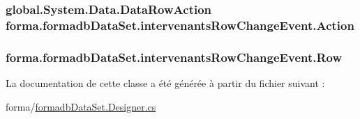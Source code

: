 \subsubsection[{\texorpdfstring{Action}{Action}}]{\setlength{\rightskip}{0pt plus 5cm}global.\+System.\+Data.\+Data\+Row\+Action forma.\+formadb\+Data\+Set.\+intervenants\+Row\+Change\+Event.\+Action\hspace{0.3cm}{\ttfamily [get]}}\hypertarget{classforma_1_1formadb_data_set_1_1intervenants_row_change_event_adc73a6ee6668313af1498cf610edba06}{}\label{classforma_1_1formadb_data_set_1_1intervenants_row_change_event_adc73a6ee6668313af1498cf610edba06}
\subsubsection[{\texorpdfstring{Row}{Row}}]{ forma.\+formadb\+Data\+Set.\+intervenants\+Row\+Change\+Event.\+Row\hspace{0.3cm}{\ttfamily [get]}}\hypertarget{classforma_1_1formadb_data_set_1_1intervenants_row_change_event_a0c1fea3405b5b8cbf8080469b253debd}{}\label{classforma_1_1formadb_data_set_1_1intervenants_row_change_event_a0c1fea3405b5b8cbf8080469b253debd}


La documentation de cette classe a été générée à partir du fichier suivant \+:\begin{DoxyCompactItemize}
\item 
forma/\hyperlink{formadb_data_set_8_designer_8cs}{formadb\+Data\+Set.\+Designer.\+cs}\end{DoxyCompactItemize}
